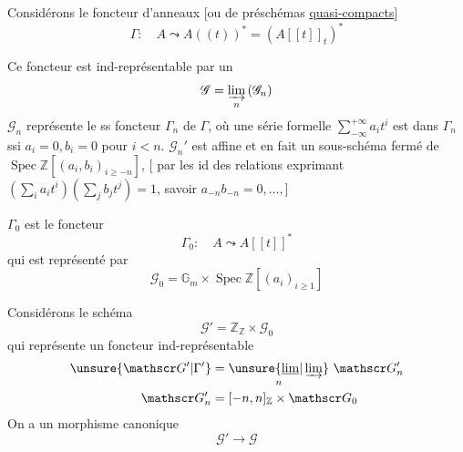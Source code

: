 Considérons le foncteur d'anneaux [ou de préschémas \uline{quasi-compacts}]
\[
\Gamma:\quad A\leadsto A((t))^{*}=(A[[t]]_{t})^{*}
\]

Ce foncteur est ind-représentable par un
\[
\mathscr G=\underset{n}{\varinjlim}\,(\mathscr G_n)
\]
$\mathscr G_n$ représente le ss foncteur $\Gamma_n$ de $\Gamma$, où une série formelle  $\sum_{-\infty}^{+\infty}a_i t^i$  est dans $\Gamma_n$ ssi $a_i=0,b_i=0$ pour $i<n$. $\mathscr G_n'$ est affine et en fait un sous-schéma fermé de $\operatorname{Spec}\mathbb Z[(a_i,b_i)_{i\geq-n}]$, [ par les  id des relations exprimant $(\sum_i a_i t^i)(\sum_j b_j t^j)=1$, savoir $a_{-n}b_{-n}=0,\ldots,$]

 $\Gamma_0$ est le foncteur
\[
\Gamma_0:\quad A\leadsto A[[t]]^{*}
\]
qui est représenté par
\[
\mathscr G_0=\mathbb G_m\times\operatorname{Spec}\mathbb Z[(a_i)_{i\geq1}]
\]

Considérons le schéma
\[
\mathscr G'=\mathbb Z_{\mathbb Z}\times\mathscr G_0
\]
qui représente un foncteur ind-représentable
\[
\begin{aligned}
\unsure{\mathscr G'|\Gamma'}&=\underset{n}{\unsure{\underline{\lim}|\varinjlim}}\ \mathscr G'_n\\
\mathscr G'_n&=[-n,n]_{\mathbb Z}\times\mathscr G_0
\end{aligned}
\]
On a un morphisme canonique
\[
\mathscr G'\longrightarrow\mathscr G
\]
